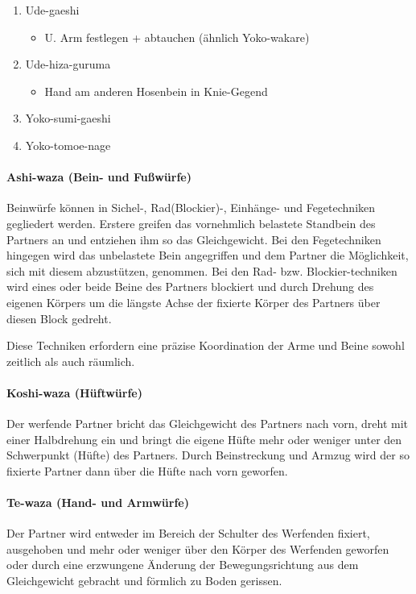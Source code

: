 \documentclass[justified, a4paper, notitlepage, captions=tableheading, nobib]{tufte-handout}
\begin{document}
\begin{itemize}
\begin{enumerate}
\begin{itemize}
\end{itemize}
\item Ude-gaeshi
\begin{itemize}
\item U. Arm festlegen + abtauchen (ähnlich Yoko-wakare)
\end{itemize}
\item Ude-hiza-guruma
\begin{itemize}
\item Hand am anderen Hosenbein in Knie-Gegend
\end{itemize}
\item Yoko-sumi-gaeshi
\item Yoko-tomoe-nage
\end{enumerate}
\end{itemize}

\paragraph{\label{orge923066}Ashi-waza (Bein- und Fußwürfe) }
\label{sec:org1eac7b4}
Beinwürfe können in Sichel-, Rad(Blockier)-, Einhänge- und Fegetechniken gegliedert werden. Erstere greifen das vornehmlich belastete Standbein des Partners an und entziehen ihm so das Gleichgewicht. Bei den Fegetechniken hingegen wird das unbelastete Bein angegriffen und dem Partner die Möglichkeit, sich mit diesem abzustützen, genommen. Bei den Rad- bzw. Blockier-techniken wird eines oder beide Beine des Partners blockiert und durch Drehung des eigenen Körpers um die längste Achse der fixierte Körper des Partners über diesen Block gedreht. 

Diese Techniken erfordern eine präzise Koordination der Arme und Beine sowohl zeitlich als auch räumlich.

\paragraph{\label{org455a0af}Koshi-waza (Hüftwürfe) }
\label{sec:orgb23d85a}
Der werfende Partner bricht das Gleichgewicht des Partners nach vorn, dreht mit einer Halbdrehung ein und bringt die eigene Hüfte mehr oder weniger unter den Schwerpunkt (Hüfte) des Partners. Durch Beinstreckung und Armzug wird der so fixierte Partner dann über die Hüfte nach vorn geworfen.

\paragraph{\label{org6c92a82}Te-waza (Hand- und Armwürfe) }
\label{sec:org6e00577}
Der Partner wird entweder im Bereich der Schulter des Werfenden fixiert, ausgehoben und mehr oder weniger über den Körper des Werfenden geworfen oder durch eine erzwungene Änderung der Bewegungsrichtung aus dem Gleichgewicht gebracht und förmlich zu Boden gerissen.
\end{document}

